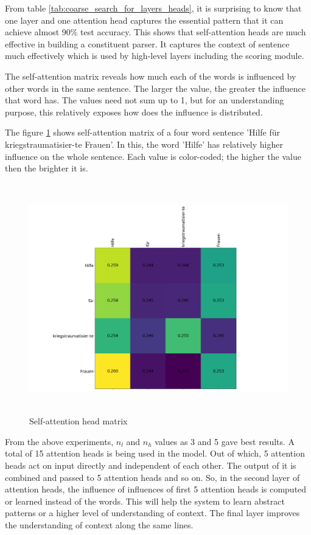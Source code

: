 \documentclass[a4paper, 11pt]{article}
\begin{document}
From table \ref{tab:coarse_search_for_layers_heads}, it is surprising to know that one layer and one attention head captures the essential pattern that it can achieve almost 90\% test accuracy. This shows that self-attention heads are much effective in building a constituent parser. It captures the context of sentence much effectively which is used by high-level layers including the scoring module.

The self-attention matrix reveals how much each of the words is influenced by other words in the same sentence. The larger the value, the greater the influence that word has. The values need not sum up to 1, but for an understanding purpose, this relatively exposes how does the influence is distributed. 

The figure \ref{fig:self-attention-head-matrix} shows self-attention matrix of a four word sentence 'Hilfe für kriegstraumatisier-te Frauen'. In this, the word 'Hilfe' has relatively higher influence on the whole sentence. Each value is color-coded; the higher the value then the brighter it is.

\begin{figure}[H]
    \centering
    \includegraphics[width=\textwidth,height=10cm,keepaspectratio=true]
    {attention-head-matrix.png}
    \caption{
        Self-attention head matrix
    }
    \label{fig:self-attention-head-matrix}
\end{figure}

From the above experiments, $n_l$ and $n_h$ values as 3 and 5 gave best results. A total of 15 attention heads is being used in the model. Out of which, 5 attention heads act on input directly and independent of each other. The output of it is combined and passed to 5 attention heads and so on.  So, in the second layer of attention heads, the influence of influences of first 5 attention heads is computed or learned instead of the words. This will help the system to learn abstract patterns or a higher level of understanding of context. The final layer improves the understanding of context along the same lines.
\end{document}
